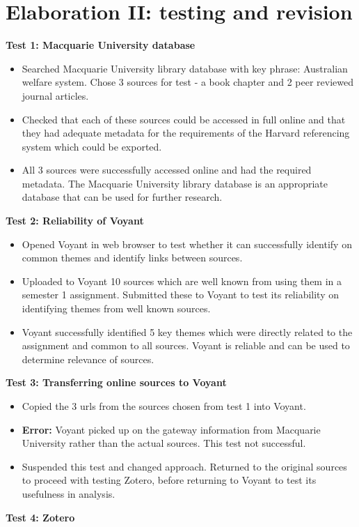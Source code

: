 \documentclass{article}
\begin{document}
\section{Elaboration II: testing and revision}
\textbf{Test 1: Macquarie University database}
\begin{itemize}
    \item Searched Macquarie University library database with key phrase: Australian welfare system. Chose 3 sources for test - a book chapter and 2 peer reviewed journal articles. 
    \item Checked that each of these sources could be accessed in full online and that they had adequate metadata for the requirements of the Harvard referencing system which could be exported. 
    \item All 3 sources were successfully accessed online and had the required metadata. The Macquarie University library database is an appropriate database that can be used for further research. 
    \end{itemize}
\textbf{Test 2: Reliability of Voyant}
    \begin{itemize}
    \item Opened Voyant in web browser to test whether it can successfully identify on common themes and identify links between sources. 
    \item Uploaded to Voyant 10 sources which are well known from using them in a semester 1 assignment. Submitted these to Voyant to test its reliability on identifying themes from well known sources.
    \item Voyant successfully identified 5 key themes which were directly related to the assignment and common to all sources. Voyant is reliable and can be used to determine relevance of sources.
    \end{itemize}
\textbf{Test 3: Transferring online sources to Voyant}
 \begin{itemize}
     \item Copied the 3 urls from the sources chosen from test 1 into Voyant.
     \item \textbf{Error:} Voyant picked up on the gateway information from Macquarie University rather than the actual sources. This test not successful.
     \item Suspended this test and changed approach. Returned to the original sources to proceed with testing Zotero, before returning to Voyant to test its usefulness in analysis.
 \end{itemize}
\textbf{Test 4: Zotero}
\end{document}
